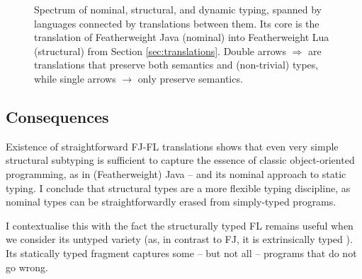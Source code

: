 \begin{figure}[t]
    \centering
    \caption{Spectrum of nominal, structural, and dynamic typing, spanned by languages connected by translations between them. Its core is the translation of Featherweight Java (nominal) into Featherweight Lua (structural) from Section \ref{sec:translations}. Double arrows $\Rightarrow$ are translations that preserve both semantics and (non-trivial) types, while single arrows $\to$ only preserve semantics.}
    \label{fig:nominal-structural-dynamic}
\end{figure}

\needspace{6em}
\subsection{Consequences}

Existence of straightforward FJ-FL translations shows that even very simple structural subtyping is sufficient to capture the essence of classic object-oriented programming, as in (Featherweight) Java -- and its nominal approach to static typing.
I conclude that structural types are a more flexible typing discipline, as nominal types can be straightforwardly erased from simply-typed programs.

I contextualise this with the fact the structurally typed FL remains useful when we consider its untyped variety (as, in contrast to FJ, it is extrinsically typed \cite{intrinsic-extrinsic}). Its statically typed fragment captures some -- but not all -- programs that do not go wrong.

